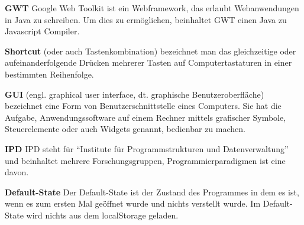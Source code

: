 \documentclass[parskip=full,11pt,twoside]{scrartcl}
\begin{document}
\textbf{GWT}
\newline
Google Web Toolkit ist ein Webframework, das erlaubt Webanwendungen in Java zu schreiben. Um dies zu ermöglichen, beinhaltet GWT einen Java zu Javascript Compiler.

\textbf{Shortcut}
\newline
(oder auch Tastenkombination) bezeichnet man das gleichzeitige oder aufeinanderfolgende Drücken mehrerer Tasten auf Computertastaturen in einer bestimmten Reihenfolge.

\textbf{GUI}
\newline
(engl. graphical user interface, dt. graphische Benutzeroberfläche) bezeichnet eine Form von Benutzerschnittstelle eines Computers. Sie hat die Aufgabe, Anwendungssoftware auf einem Rechner mittels grafischer Symbole, Steuerelemente oder auch Widgets genannt, bedienbar zu machen.

\textbf{IPD}
\newline
IPD steht für \enquote{Institute für Programmstrukturen und Datenverwaltung} und beinhaltet mehrere Forschungsgruppen, Programmierparadigmen ist eine davon.

\textbf{Default-State}
\newline
Der Default-State ist der Zustand des Programmes in dem es ist, wenn es zum ersten Mal geöffnet wurde und nichts verstellt wurde. Im Default-State wird nichts aus dem localStorage geladen.
\end{document}
